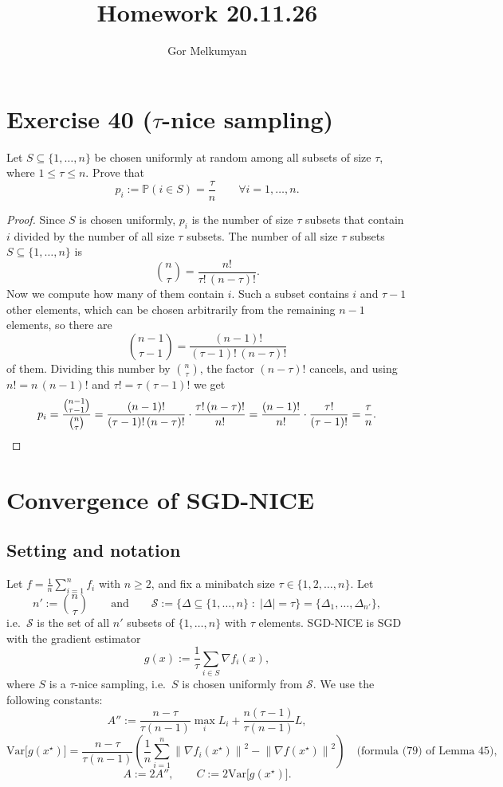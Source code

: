 \documentclass[11pt,a4paper]{article}
\title{Homework 20.11.26}
\author{Gor Melkumyan}
\date{}
\newcommand{\Prob}{\mathbb{P}}
\newcommand{\norm}[1]{\left\| #1 \right\|}
\newcommand{\xs}{x^\star}
\newcommand{\Var}{\mathrm{Var}}
\begin{document}
\maketitle

\section*{Exercise 40 ($\tau$-nice sampling)}

Let $S \subseteq \{1,\dots,n\}$ be chosen uniformly at random among all subsets of size $\tau$,
where $1 \le \tau \le n$. Prove that
\[
  p_i := \Prob(i \in S) = \frac{\tau}{n} \qquad \forall i = 1,\dots,n.
\]

\begin{proof}
Since $S$ is chosen uniformly, $p_i$ is the number of size $\tau$ subsets that contain $i$ divided by
the number of all size $\tau$ subsets. The number of all size $\tau$ subsets
$S \subseteq \{1,\dots,n\}$ is
\[
  \binom{n}{\tau} = \frac{n!}{\tau!\,(n-\tau)!} .
\]
Now we compute how many of them contain $i$. Such a subset contains $i$ and $\tau-1$ other elements,
which can be chosen arbitrarily from the remaining $n-1$ elements, so there are
\[
  \binom{n-1}{\tau-1} = \frac{(n-1)!}{(\tau-1)!\,(n-\tau)!}
\]
of them. Dividing this number by $\binom{n}{\tau}$, the factor $(n-\tau)!$ cancels, and using
$n! = n\,(n-1)!$ and $\tau! = \tau\,(\tau-1)!$ we get
\[
  p_i = \frac{\binom{n-1}{\tau-1}}{\binom{n}{\tau}}
  = \frac{(n-1)!}{(\tau-1)!\,(n-\tau)!}\cdot\frac{\tau!\,(n-\tau)!}{n!}
  = \frac{(n-1)!}{n!}\cdot\frac{\tau!}{(\tau-1)!}
  = \frac{\tau}{n} . \qedhere
\]
\end{proof}

\section*{Convergence of SGD-NICE}

\subsection*{Setting and notation}

Let $f = \frac{1}{n}\sum_{i=1}^n f_i$ with $n \ge 2$, and fix a minibatch size $\tau \in \{1,2,\dots,n\}$.
Let
\[
  n' := \binom{n}{\tau}
  \qquad\text{and}\qquad
  \mathcal{S} := \bigl\{\Delta \subseteq \{1,\dots,n\} \;:\; |\Delta| = \tau\bigr\} = \{\Delta_1,\dots,\Delta_{n'}\},
\]
i.e.\ $\mathcal{S}$ is the set of all $n'$ subsets of $\{1,\dots,n\}$ with $\tau$ elements.
SGD-NICE is SGD with the gradient estimator
\[
  g(x) := \frac{1}{\tau}\sum_{i \in S} \nabla f_i(x),
\]
where $S$ is a $\tau$-nice sampling, i.e.\ $S$ is chosen uniformly from $\mathcal{S}$.
We use the following constants:
\[
  A'' := \frac{n-\tau}{\tau(n-1)}\max_i L_i + \frac{n(\tau-1)}{\tau(n-1)}L ,
\]
\[
  \Var\bigl[g(\xs)\bigr] = \frac{n-\tau}{\tau(n-1)}
  \left(\frac{1}{n}\sum_{i=1}^n \norm{\nabla f_i(\xs)}^2 - \norm{\nabla f(\xs)}^2\right)
  \quad \text{(formula (79) of Lemma 45)},
\]
\[
  A := 2A'', \qquad C := 2\Var\bigl[g(\xs)\bigr].
\]
\end{document}
